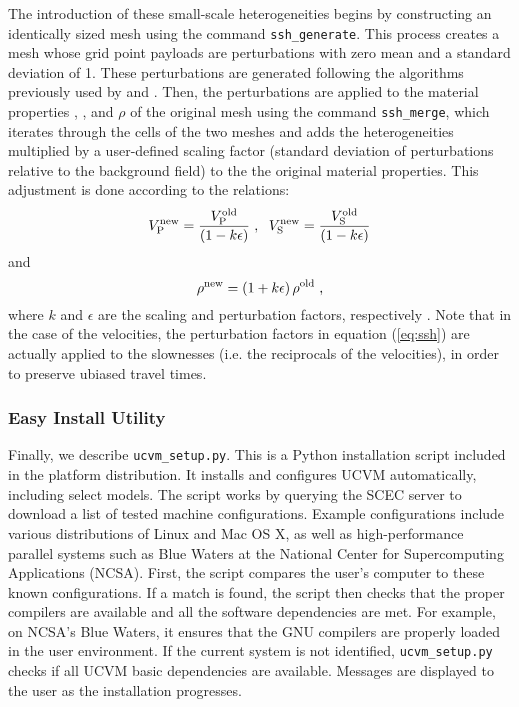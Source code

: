 The introduction of these small-scale heterogeneities begins by constructing an identically sized mesh using the command \texttt{ssh\_generate}. This process creates a mesh whose grid point payloads are perturbations with zero mean and a standard deviation of 1. These perturbations are generated following the algorithms previously used by \citet{Withers_2013_SCEC} and \citet{Savran_2014_SSA}. Then, the perturbations are applied to the material properties \vp{}, \vs{}, and $\rho$ of the original mesh using the command \texttt{ssh\_merge}, which iterates through the cells of the two meshes and adds the heterogeneities multiplied by a user-defined scaling factor (standard deviation of perturbations relative to the background field) to the the original material properties. This adjustment is done according to the relations:
%
\begin{equation}
\label{eq:ssh}
	V_{\mathrm{P}}^{\mathrm{new}} = \frac{ V_{\mathrm{P}}^{\mathrm{old}} }{ (1 - k \epsilon) }
	\hspace{0.3em},
	\hspace{0.6em}
	V_{\mathrm{S}}^{\mathrm{new}} = \frac{ V_{\mathrm{S}}^{\mathrm{old}} }{ (1 - k \epsilon) }
\end{equation}
%
and
%
\begin{equation}
	\rho^{\mathrm{new}} = (1 + k \epsilon) \, \rho^{\mathrm{old}}
	\hspace{0.3em},
\end{equation}
%
where $k$ and $\epsilon$ are the scaling and perturbation factors, respectively \citep[see][]{Withers_2013_SCEC, Savran_2014_SSA}. Note that in the case of the velocities, the perturbation factors in equation (\ref{eq:ssh}) are actually applied to the slownesses (i.e. the reciprocals of the velocities), in order to preserve ubiased travel times.

\subsubsection{Easy Install Utility}
\label{sec:easy.install}

Finally, we describe \texttt{ucvm\_setup.py}. This is a Python installation script included in the platform distribution. It installs and configures UCVM automatically, including select models. The script works by querying the SCEC server to download a list of tested machine configurations. Example configurations include various distributions of Linux and Mac OS X, as well as high-performance parallel systems such as Blue Waters at the National Center for Supercomputing Applications (NCSA). First, the script compares the user's computer to these known configurations. If a match is found, the script then checks that the proper compilers are available and all the software dependencies are met. For example, on NCSA's Blue Waters, it ensures that the GNU compilers are properly loaded in the user environment. If the current system is not identified, \texttt{ucvm\_setup.py} checks if all UCVM basic dependencies are available. Messages are displayed to the user as the installation progresses.

